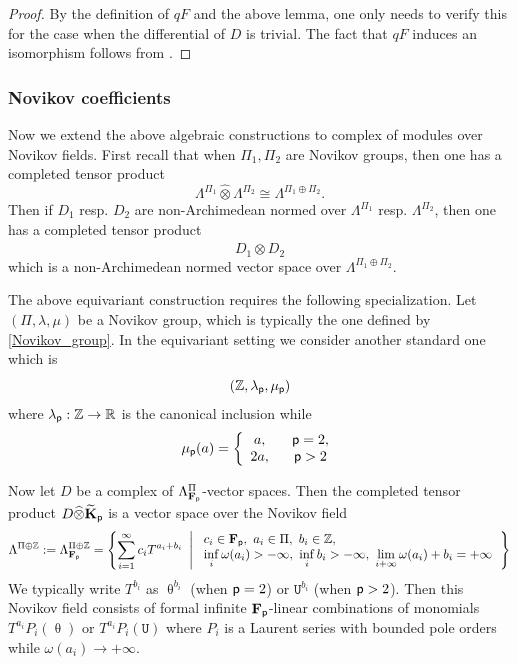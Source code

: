 \documentclass[reqno, 10pt]{amsart}
\numberwithin{equation}{section}
\numberwithin{equation}{section}
\theoremstyle{definition}
\theoremstyle{remark}
\newcommand{\beqn}{\begin{equation*}}
\newcommand{\eeqn}{\end{equation*}}
\newcommand{\mb}{\mathbb}
\newcommand{\p}{{\sf p}}
\newcommand{\fp}{{\bf F}_{\sf p}}
\newcommand{\tkp}{\wt{\bf K}_{\sf p}}
\newcommand{\tu}{\mathtt{U}}
\newcommand{\wt}{\widetilde}
\begin{document}
\begin{proof}
By the definition of $qF$ and the above lemma, one only needs to verify this for the case when the differential of $D$ is trivial. The fact that $qF$ induces an isomorphism follows from \cite[Lemma 3.1]{shelukhin-zhao}.
\end{proof}





\subsubsection{Novikov coefficients}

Now we extend the above algebraic constructions to complex of modules over Novikov fields. First recall that when $\Pi_1, \Pi_2$ are Novikov groups, then one has a completed tensor product
\beqn
\Lambda^{\Pi_1}\widehat{\otimes} \Lambda^{\Pi_2} \cong \Lambda^{\Pi_1 \oplus \Pi_2}.
\eeqn
Then if $D_1$ resp. $D_2$ are non-Archimedean normed over $\Lambda^{\Pi_1}$ resp. $\Lambda^{\Pi_2}$, then one has a completed tensor product
\beqn
D_1 \widehat{\otimes} D_2
\eeqn
which is a non-Archimedean normed vector space over $\Lambda^{\Pi_1 \oplus \Pi_2}$.

The above equivariant construction requires the following specialization. Let $(\Pi, \lambda, \mu)$ be a Novikov group, which is typically the one defined by \eqref{Novikov_group}. In the equivariant setting we consider another standard one which is 
\beqn
({\mb Z}, \lambda_\p, \mu_\p)
\eeqn
where $\lambda_\p: {\mb Z} \to {\mb R}$ is the canonical inclusion while
\beqn
\mu_\p(a) = \left\{ \begin{array}{cc} a,\ &\ \p = 2,\\
2a,\ &\ \p > 2 \end{array}\right.
\eeqn


Now let $D$ be a complex of $\Lambda_{\fp}^\Pi$-vector spaces. Then the completed tensor product $D \widehat{\otimes} \tkp$ is a vector space over the Novikov field 
\beqn
\Lambda^{\Pi \oplus {\mb Z}}:= \Lambda^{\Pi \oplus {\mb Z}}_{\fp} = \left\{ \sum_{i=1}^\infty c_i T^{a_i + b_i}\ \left| \ \begin{array}{l} c_i \in \fp,\ a_i \in \Pi,\ b_i \in {\mb Z},\\
\displaystyle \inf_i \omega(a_i) > -\infty,\ \inf_i b_i > -\infty,\ \lim_{i +\infty} \omega(a_i) + b_i = +\infty \end{array} \right.\right\}
\eeqn
We typically write $T^{b_i}$ as $\uptheta^{b_i}$ (when $\p =2$) or $\tu^{b_i}$ (when $\p > 2$). Then this Novikov field consists of formal infinite $\fp$-linear combinations of monomials $T^{a_i} P_i( \uptheta)$ or $T^{a_i} P_i(\tu)$ where $P_i$ is a Laurent series with bounded pole orders while $\omega(a_i) \to +\infty$. 
\end{document}
